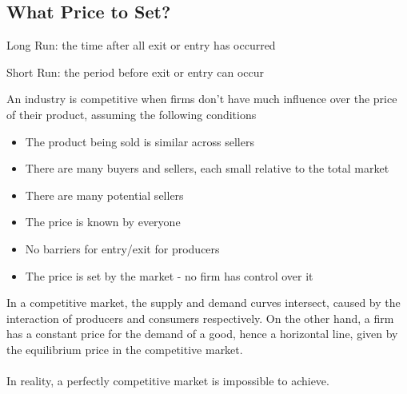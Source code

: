 \documentclass[12pt]{article}
\begin{document}
\subsection{What Price to Set?}
\begin{definition} Long Run: the time after all exit or entry has occurred \end{definition}
\begin{definition} Short Run: the period before exit or entry can occur \end{definition} 
An industry is competitive when firms don't have much influence over the price of their product, assuming the following conditions \begin{itemize}
\item The product being sold is similar across sellers
\item There are many buyers and sellers, each small relative to the total market 
\item There are many potential sellers 
\item The price is known by everyone 
\item No barriers for entry/exit for producers 
\item The price is set by the market - no firm has control over it 
\end{itemize}
In a competitive market, the supply and demand curves intersect, caused by the interaction of producers and consumers respectively. On the other hand, a firm has a constant price for the demand of a good, hence a horizontal line, given by the equilibrium price in the competitive market. \\~\\
In reality, a perfectly competitive market is impossible to achieve. 
\end{document}
